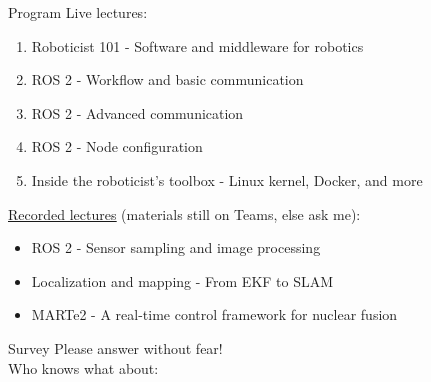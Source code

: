 \begin{frame}{Program}
  Live lectures:
  \begin{enumerate}
    \item Roboticist 101 - Software and middleware for robotics
    \item ROS 2 - Workflow and basic communication
    \item ROS 2 - Advanced communication
    \item ROS 2 - Node configuration
    \item Inside the roboticist's toolbox - Linux kernel, Docker, and more
  \end{enumerate}
  \href{https://www.youtube.com/playlist?list=PLWRH7MKE68L06LpRmVIiFjQZqDZAdPaXS}{\color{blue}\underline{Recorded lectures}} (materials still on Teams, else ask me):
  \begin{itemize}
    \item ROS 2 - Sensor sampling and image processing
    \item Localization and mapping - From EKF to SLAM
    \item MARTe2 - A real-time control framework for nuclear fusion
  \end{itemize}
\end{frame}

\begin{frame}{Survey}
  Please answer without fear!\\
  \bigskip
  Who knows what about:
  \begin{itemize}
  \end{itemize}
\end{frame}

